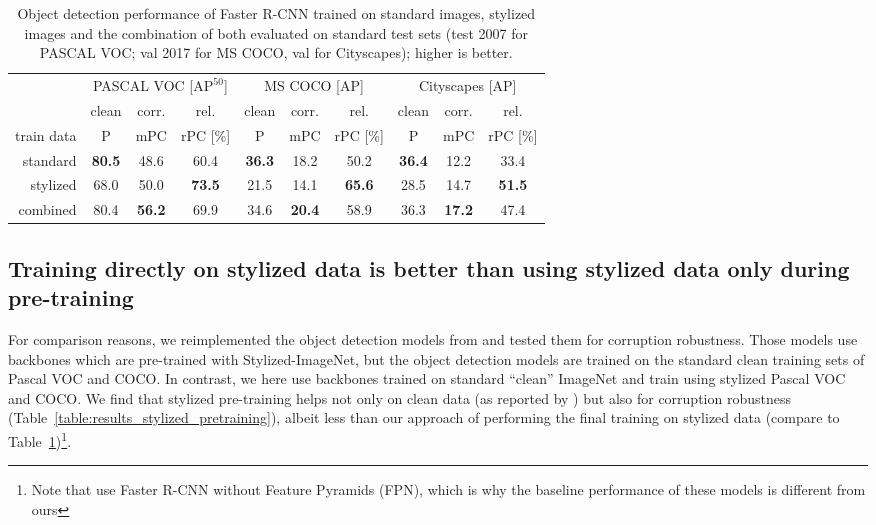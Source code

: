 \documentclass{article}
\newcommand{\highlight}[1]{{\cellcolor{gray.220} #1}}
\begin{document}
\begin{table}[t]\footnotesize
\begin{center}
\begin{tabular}{r|ccc|ccc|ccc}
\toprule
 &\multicolumn{3}{c|}{PASCAL VOC [$\operatorname{AP^{50}}$]} & \multicolumn{3}{c|}{MS COCO [AP]} & \multicolumn{3}{c}{Cityscapes [AP]} \\
& clean & \highlight{corr.} & rel. & clean & \highlight{corr.} & rel. & clean & \highlight{corr.} & rel.\\
train data & P & \highlight{mPC} & rPC [\%] & P & \highlight{mPC} & rPC [\%] & P & \highlight{mPC} & rPC [\%] \\
\hline
standard & \textbf{80.5} & \highlight{48.6} & 60.4 & \textbf{36.3} & \highlight{18.2} & 50.2 & \textbf{36.4} & \highlight{12.2} & 33.4 \\
\hline
stylized & 68.0 & \highlight{50.0} & \textbf{73.5} & 21.5 & \highlight{14.1} & \textbf{65.6} & 28.5 & \highlight{14.7} & \textbf{51.5}\\
combined & 80.4 & \highlight{\textbf{56.2}} & 69.9 & 34.6 & \highlight{\textbf{20.4}} & 58.9 & 36.3 & \highlight{\textbf{17.2}} & 47.4\\
\bottomrule
\end{tabular}
\caption{Object detection performance of Faster R-CNN trained on standard images, stylized images and the combination of both evaluated on standard test sets (test 2007 for PASCAL VOC; val 2017 for MS COCO, val for Cityscapes); higher is better.}
\label{table:results_stylized}
\vspace{-0.3cm}
\end{center}
\end{table}

\subsection{Training directly on stylized data is better than using stylized data only during pre-training}

For comparison reasons, we reimplemented the object detection models from \citet{geirhos2019imagenettrained} and tested them for corruption robustness. Those models use backbones which are pre-trained with Stylized-ImageNet, but the object detection models are trained on the standard clean training sets of Pascal VOC and COCO. In contrast, we here use backbones trained on standard ``clean'' ImageNet and train using stylized Pascal VOC and COCO. We find that stylized pre-training helps not only on clean data (as reported by \cite{geirhos2019imagenettrained}) but also for corruption robustness (Table~\ref{table:results_stylized_pretraining}), albeit less than our approach of performing the final training on stylized data (compare to Table~\ref{table:results_stylized})\footnote{Note that \cite{geirhos2019imagenettrained} use Faster R-CNN without Feature Pyramids (FPN), which is why the baseline performance of these models is different from ours}.
\end{document}
